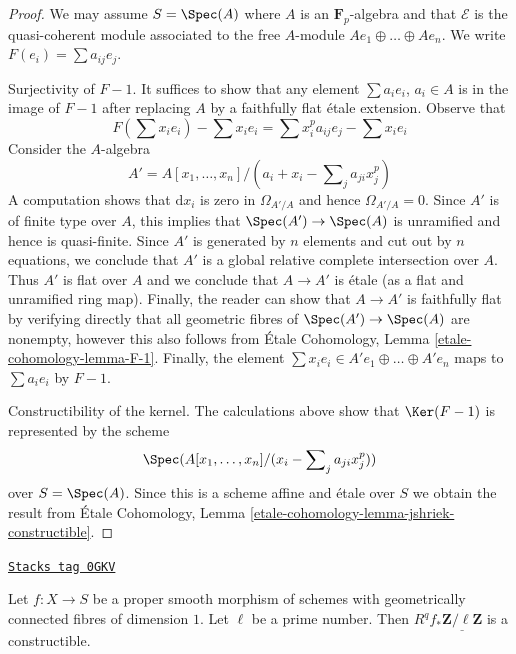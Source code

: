 \begin{proof}
We may assume $S = \Spec(A)$ where $A$ is an $\mathbf{F}_p$-algebra
and that $\mathcal{E}$ is the quasi-coherent module associated
to the free $A$-module $Ae_1 \oplus \ldots \oplus Ae_n$.
We write $F(e_i) = \sum a_{ij} e_j$.

\medskip\noindent
Surjectivity of $F - 1$. It suffices to show that any element
$\sum a_i e_i$, $a_i \in A$ is in the image of $F - 1$
after replacing $A$ by a faithfully flat \'etale extension.
Observe that
$$
F(\sum x_ie_i) - \sum x_i e_i = \sum x_i^p a_{ij} e_j - \sum x_i e_i
$$
Consider the $A$-algebra
$$
A' = A[x_1, \ldots, x_n]/(a_i + x_i - \sum\nolimits_j a_{ji} x_j^p)
$$
A computation shows that $\text{d}x_i$ is zero in $\Omega_{A'/A}$
and hence $\Omega_{A'/A} = 0$. Since $A'$ is of finite type over
$A$, this implies that $\Spec(A') \to \Spec(A)$ is unramified
and hence is quasi-finite. Since $A'$ is generated by $n$ elements
and cut out by $n$ equations, we conclude that $A'$
is a global relative complete intersection over $A$.
Thus $A'$ is flat over $A$ and we conclude that $A \to A'$
is \'etale (as a flat and unramified ring map). Finally,
the reader can show that $A \to A'$ is faithfully flat
by verifying directly that all geometric fibres of
$\Spec(A') \to \Spec(A)$ are nonempty, however this also
follows from \'Etale Cohomology, Lemma
\ref{etale-cohomology-lemma-F-1}.
Finally, the element $\sum x_i e_i \in A'e_1 \oplus \ldots \oplus A'e_n$
maps to $\sum a_i e_i$ by $F - 1$.

\medskip\noindent
Constructibility of the kernel. The calculations above show that
$\Ker(F - 1)$ is represented by the scheme
$$
\Spec(A[x_1, \ldots, x_n]/(x_i - \sum\nolimits_j a_{ji} x_j^p))
$$
over $S = \Spec(A)$. Since this is a scheme affine and \'etale
over $S$ we obtain the result from
\'Etale Cohomology, Lemma \ref{etale-cohomology-lemma-jshriek-constructible}.
\end{proof}

\begin{lemma}
\label{more-etale-lemma-proper-smooth-family-curves}
\href{https://stacks.math.columbia.edu/tag/0GKV}{\texttt{Stacks tag 0GKV}}

Let $f : X \to S$ be a proper smooth morphism of schemes with
geometrically connected fibres of dimension $1$. Let $\ell$
be a prime number. Then $R^qf_*\underline{\mathbf{Z}/\ell\mathbf{Z}}$
is a constructible.
\end{lemma}

